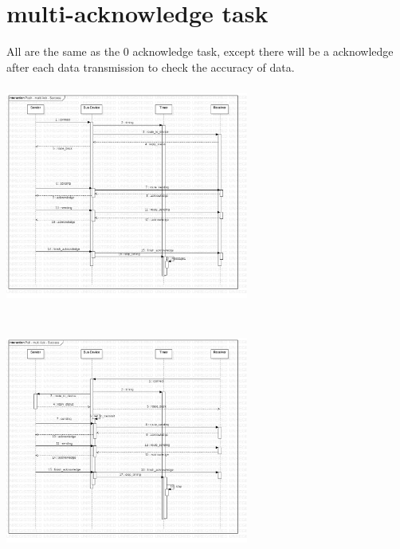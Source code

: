 \documentclass[12pt,article]{memoir}
\begin{document}
\section{multi-acknowledge task}
All are the same as the 0 acknowledge task, except there will be a acknowledge after each data transmission to check the accuracy of data.\\
\includegraphics[width=8cm,height=8cm]{img/DR00012_Push_multi_Ack_Success.jpg}
\includegraphics[width=8cm,height=8cm]{img/DR00012_Pull_multi_Ack_Success.jpg}
\end{document}
